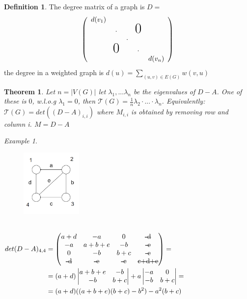 \documentclass{article}
\newtheorem*{theorem}{Theorem}
\theoremstyle{definition}
\newtheorem*{definition}{Definition}
\theoremstyle{remark}
\newtheorem*{example}{Example}
\begin{document}
\begin{definition}
    The degree matrix of a graph is  $D= $
    \[
        \left(
        \begin{array}{ccccc}
        d(v_1)                                    \\
          & \cdot             &   & \text{\huge0}\\
          &               & \cdot                \\
          & \text{\huge0} &   & \cdot            \\
          &               &   &   & d(v_n)
        \end{array}
        \right)
      \]
   the degree in a weighted graph is $d(u) = \sum_{(u,v) \in E(G)} w(v,u)$
\end{definition}
\begin{theorem}
    Let $n=|V(G)|$ let $\lambda_1,...\lambda_n$ be the eigenvalues of $D-A$. One of these is $0$, w.l.o.g $\lambda_1 = 0$, then $\mathcal{T}(G)=\frac{1}{n} \lambda_2 \cdot ... \cdot \lambda_n$.
    Equivalently: $\mathcal{T}(G) = det((D-A)_{i,i})$ where $M_{i,i}$ is obtained by removing row and column i. $M=D-A$
\end{theorem}
\begin{example}
    \begin{figure}[h!]
        \centering
        \includegraphics[width=3cm]{graph.png}
    \end{figure}
    $ $\\
    $\begin{aligned}
        det(D-A)_{4,4} & = \begin{pmatrix}
            a+d & -a & 0 & \text{\st{-d}}\\
            -a & a+b+e & -b & \text{\st{-e}}\\
            0 & -b & b+c & \text{\st{-c}}\\
            \text{\st{-d}} & \text{\st{-e}} & \text{\st{-c}} & \text{\st{c+d+e}}
        \end{pmatrix} = \\
         &= (a+d) 
        \begin{vmatrix}
            a+b+e & -b\\
            -b & b+c
        \end{vmatrix} + a 
        \begin{vmatrix}
            -a & 0\\
            -b & b+c
        \end{vmatrix} = \\
        &= (a+d)((a+b+e)(b+c)-b^2)-a^2(b+c)
    \end{aligned}$
\end{example}
\pagebreak
\end{document}
